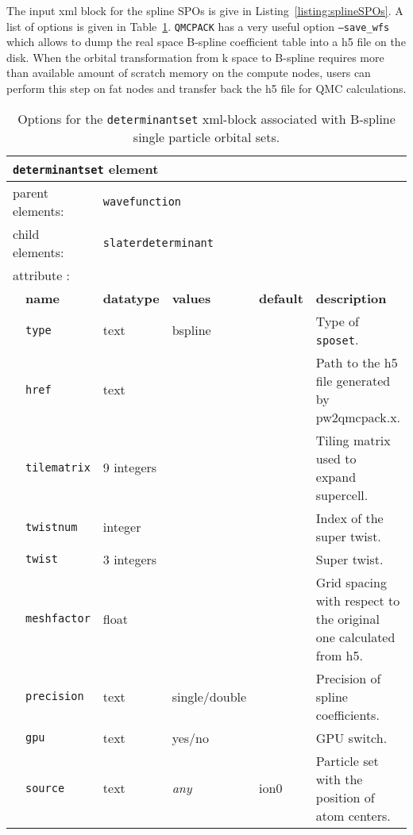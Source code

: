 The input xml block for the spline SPOs is give in Listing~\ref{listing:splineSPOs}. A list of options is given in 
Table~\ref{table:splineSPOs}. \texttt{QMCPACK} has a very useful option \texttt{--save\_wfs} which allows to dump 
the real space B-spline coefficient table into a h5 file on the disk.
When the orbital transformation from k space to B-spline requires more than available amount of scratch memory on the compute nodes, 
users can perform this step on fat nodes and transfer back the h5 file for QMC calculations.

\begin{table}[h]
\begin{center}
\begin{tabularx}{\textwidth}{l l l l l l }
\hline
\multicolumn{6}{l}{\texttt{determinantset} element} \\
\hline
\multicolumn{2}{l}{parent elements:} & \multicolumn{4}{l}{\texttt{wavefunction}}\\
\multicolumn{2}{l}{child  elements:} & \multicolumn{4}{l}{\texttt{slaterdeterminant}}\\
\multicolumn{2}{l}{attribute      :} & \multicolumn{4}{l}{}\\
   &   \bfseries name              & \bfseries datatype & \bfseries values & \bfseries default   & \bfseries description \\
   &   \texttt{type}                    &  text               &   bspline   &               &  Type of \texttt{sposet}. \\
   &   \texttt{href}                    &  text               &             &               &  Path to the h5 file generated by pw2qmcpack.x. \\
   &   \texttt{tilematrix}              &  9 integers         &             &               &  Tiling matrix used to expand supercell. \\
   &   \texttt{twistnum}                &  integer            &             &               &  Index of the super twist. \\
   &   \texttt{twist}                   &  3 integers         &             &               &  Super twist. \\
   &   \texttt{meshfactor}              &  float              &             &               &  Grid spacing with respect to the original one calculated from h5. \\
   &   \texttt{precision}               &  text               &  single/double  &               &  Precision of spline coefficients. \\
   &   \texttt{gpu}                    &  text               &  yes/no      &               &  GPU switch. \\
   &   \texttt{source}               &  text               &   \textit{any}    &  ion0        & Particle set with the position of atom centers. \\
  \hline
\end{tabularx}
\end{center}
\caption{Options for the \texttt{determinantset} xml-block associated with B-spline single particle orbital sets.}
\label{table:splineSPOs}
\end{table}

